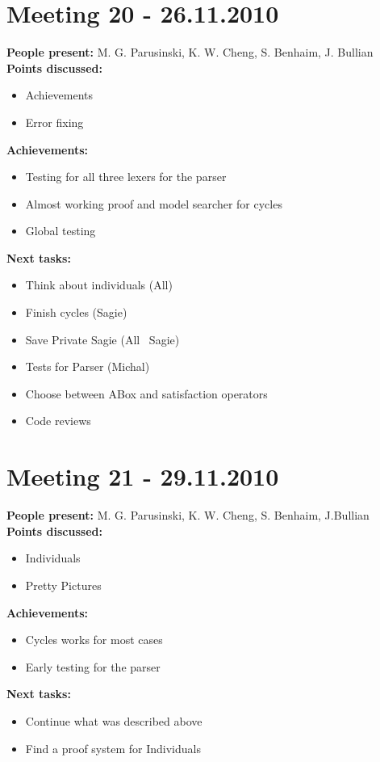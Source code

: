 \documentclass[12pt,a4paper]{article}
\begin{document}
\section*{Meeting 20 - 26.11.2010}
\textbf{People present:} M. G. Parusinski, K. W. Cheng, S. Benhaim, J. Bullian \\
\textbf{Points discussed:}
\begin{itemize}
\item Achievements
\item Error fixing
\end{itemize}
\textbf{Achievements:}
\begin{itemize}
\item Testing for all three lexers for the parser
\item Almost working proof and model searcher for cycles
\item Global testing
\end{itemize}
\textbf{Next tasks:}
\begin{itemize}
\item Think about individuals (All)
\item Finish cycles (Sagie)
\item Save Private Sagie (All \ Sagie)
\item Tests for Parser (Michal)
\item Choose between ABox and satisfaction operators
\item Code reviews
\end{itemize}

\section*{Meeting 21 - 29.11.2010}
\textbf{People present:} M. G. Parusinski, K. W. Cheng, S. Benhaim, J.Bullian \\
\textbf{Points discussed:}
\begin{itemize}
\item Individuals
\item Pretty Pictures
\end{itemize}
\textbf{Achievements:}
\begin{itemize}
\item Cycles works for most cases
\item Early testing for the parser
\end{itemize}
\textbf{Next tasks:}
\begin{itemize}
\item Continue what was described above
\item Find a proof system for Individuals
\end{itemize}
\end{document}
